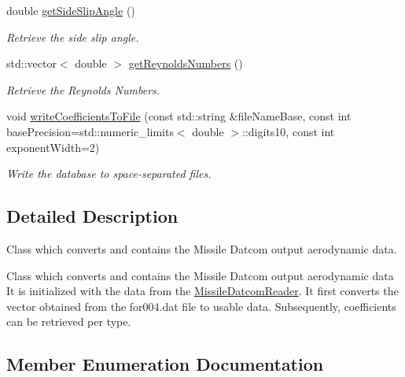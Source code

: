 \begin{DoxyCompactItemize}
double \hyperlink{classtudat_1_1input__output_1_1MissileDatcomData_afa1d01855c36699eb9e39ab8f883f781}{get\+Side\+Slip\+Angle} ()
\begin{DoxyCompactList}\small\item\em Retrieve the side slip angle. \end{DoxyCompactList}\item 
std\+::vector$<$ double $>$ \hyperlink{classtudat_1_1input__output_1_1MissileDatcomData_a65edc8773e36bdbe06aa3b2ec54e0d8c}{get\+Reynolds\+Numbers} ()
\begin{DoxyCompactList}\small\item\em Retrieve the Reynolds Numbers. \end{DoxyCompactList}\item 
void \hyperlink{classtudat_1_1input__output_1_1MissileDatcomData_adcc70a61395544f5fde79dd17e40e8c0}{write\+Coefficients\+To\+File} (const std\+::string \&file\+Name\+Base, const int base\+Precision=std\+::numeric\+\_\+limits$<$ double $>$\+::digits10, const int exponent\+Width=2)
\begin{DoxyCompactList}\small\item\em Write the database to space-\/separated files. \end{DoxyCompactList}\end{DoxyCompactItemize}


\subsection{Detailed Description}
Class which converts and contains the Missile Datcom output aerodynamic data. 

Class which converts and contains the Missile Datcom output aerodynamic data It is initialized with the data from the \hyperlink{classtudat_1_1input__output_1_1MissileDatcomReader}{Missile\+Datcom\+Reader}. It first converts the vector obtained from the for004.\+dat file to usable data. Subsequently, coefficients can be retrieved per type. 

\subsection{Member Enumeration Documentation}
